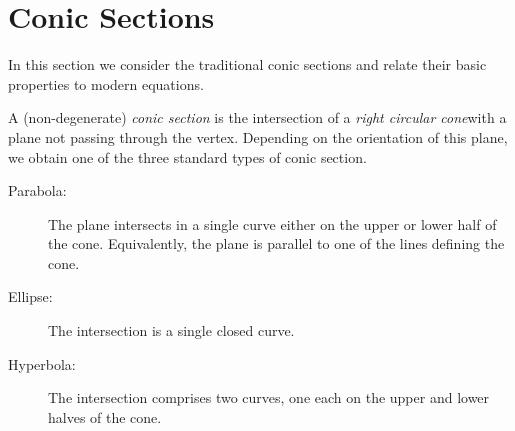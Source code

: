 \graphicspath{{6conics/asy/}}

\section{Conic Sections}

In this section we consider the traditional conic sections and relate their basic properties to modern equations.

\begin{defn}{}{}
A (non-degenerate) \emph{conic section} is the intersection of a \emph{right circular cone}\footnotemark with a plane not passing through the vertex.\smallbreak
Depending on the orientation of this plane, we obtain one of the three standard types of conic section.
\begin{description}
	\item[\normalfont Parabola:] The plane intersects in a single curve either on the upper or lower half of the cone. Equivalently, the plane is parallel to one of the lines defining the cone.
	\item[\normalfont Ellipse:] The intersection is a single closed curve.
	\item[\normalfont Hyperbola:] The intersection comprises two curves, one each on the upper and lower halves of the cone. 
\end{description}
\end{defn}
